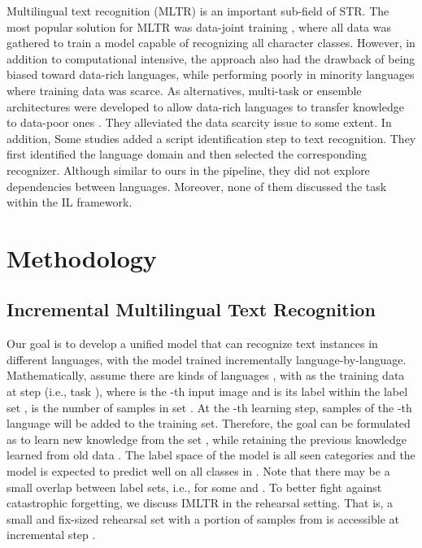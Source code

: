 \documentclass[10pt,twocolumn,letterpaper]{article}
\begin{document}
Multilingual text recognition (MLTR) is an important sub-field of STR. The most popular solution for MLTR was data-joint training \cite{nayef2017mlt2017,buvsta2018e2emlt,nayef2019mlt2019,baek2020crafts}, where all data was gathered to train a model capable of recognizing all character classes. However, in addition to computational intensive, the approach also had the drawback of being biased toward data-rich languages, while performing poorly in minority languages where training data was scarce. As alternatives, multi-task or ensemble architectures were developed to allow data-rich languages to transfer knowledge to data-poor ones \cite{bai2014image,cui2017multilingual}. They alleviated the data scarcity issue to some extent. In addition, Some studies \cite{fujii2017seqscript,gomez2017improving,shi2015automatic,huang2021multiocr} added a script identification step to text recognition. They first identified the language domain and then selected the corresponding recognizer. Although similar to ours in the pipeline, they did not explore dependencies between languages. Moreover, none of them discussed the task within the IL framework.

\section{Methodology}
\subsection{Incremental Multilingual Text Recognition}
Our goal is to develop a unified model that can recognize text instances in different languages, with the model trained incrementally language-by-language. Mathematically, assume there are  kinds of languages , with  as the training data at step  (i.e., task ), where  is the -th input image and  is its label within the label set ,  is the number of samples in set . At the -th learning step, samples of the -th language will be added to the training set. Therefore, the goal can be formulated as to learn new knowledge from the set , while retaining the previous knowledge learned from old data . The label space of the model is all seen categories  and the model is expected to predict well on all classes in . Note that there may be a small overlap between label sets, i.e.,  for some  and . To better fight against catastrophic forgetting, we discuss IMLTR in the rehearsal setting. That is, a small and fix-sized rehearsal set  with a portion of samples from  is accessible at incremental step . 
\end{document}
